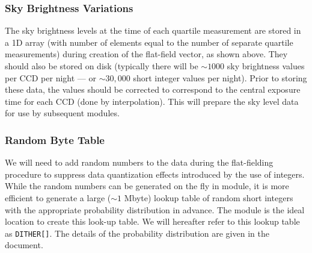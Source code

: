 \subsubsection{Sky Brightness Variations} 

The sky brightness levels at the time of each quartile measurement
are stored in a 1D array (with number of elements equal to the number
of separate quartile measurements) during creation of the flat-field
vector, as shown above. They should also be
stored on disk (typically there will be $\sim1000$ sky brightness
values per CCD per night --- or $\sim30,000$ short integer values per night).
Prior to storing these data, the values should be corrected to correspond
to the central exposure time for each CCD (done by interpolation). This
will prepare the sky level data for use by subsequent modules.

\subsubsection{Random Byte Table}

We will need to add random numbers to the data during the flat-fielding
procedure to suppress data quantization effects introduced by the use
of integers. While the random numbers can be generated
on the fly in \cfrm module, it is more efficient to generate a large
($\sim1$ Mbyte) lookup table of random short integers with the appropriate
probability distribution in advance. The \icfrm module is the ideal
location to create this look-up table. We will hereafter refer to this
lookup table as {\tt DITHER[]}. The details of the probability distribution
are given in the \cfrm document.

